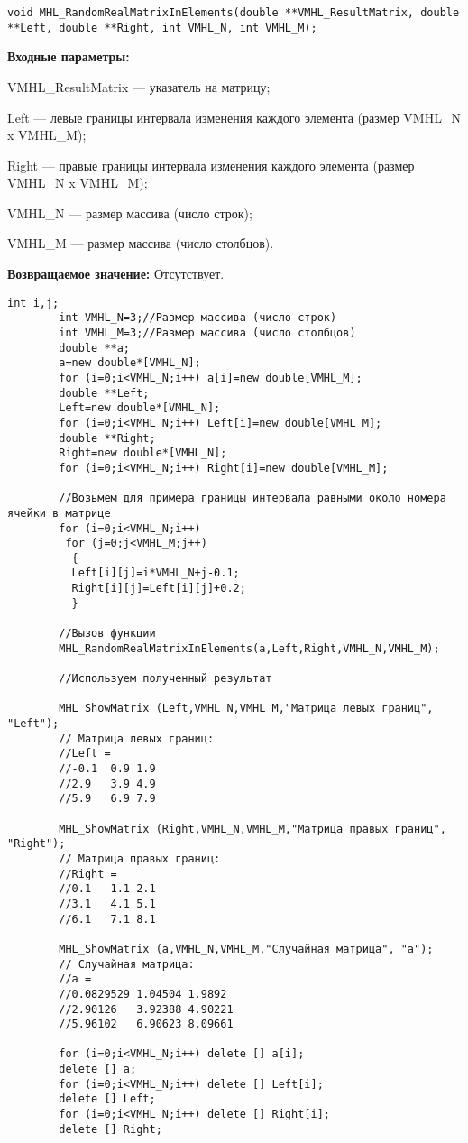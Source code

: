 \documentclass[a4paper,12pt]{article}
\begin{document}
\begin{lstlisting}[label=code_syntax_MHL_RandomRealMatrixInElements,caption=Синтаксис]
void MHL_RandomRealMatrixInElements(double **VMHL_ResultMatrix, double **Left, double **Right, int VMHL_N, int VMHL_M);
\end{lstlisting}

\textbf{Входные параметры:}

 VMHL\_ResultMatrix --- указатель на матрицу;
 
Left --- левые границы интервала изменения каждого элемента (размер VMHL\_N x VMHL\_M);

 Right --- правые границы интервала изменения каждого элемента (размер VMHL\_N x VMHL\_M);
 
 VMHL\_N --- размер массива (число строк);
 
 VMHL\_M --- размер массива (число столбцов).

\textbf{Возвращаемое значение:}
Отсутствует.


\begin{lstlisting}[label=code_use_MHL_RandomRealMatrixInElements,caption=Пример использования]
        int i,j;
        int VMHL_N=3;//Размер массива (число строк)
        int VMHL_M=3;//Размер массива (число столбцов)
        double **a;
        a=new double*[VMHL_N];
        for (i=0;i<VMHL_N;i++) a[i]=new double[VMHL_M];
        double **Left;
        Left=new double*[VMHL_N];
        for (i=0;i<VMHL_N;i++) Left[i]=new double[VMHL_M];
        double **Right;
        Right=new double*[VMHL_N];
        for (i=0;i<VMHL_N;i++) Right[i]=new double[VMHL_M];

        //Возьмем для примера границы интервала равными около номера ячейки в матрице
        for (i=0;i<VMHL_N;i++)
         for (j=0;j<VMHL_M;j++)
          {
          Left[i][j]=i*VMHL_N+j-0.1;
          Right[i][j]=Left[i][j]+0.2;
          }

        //Вызов функции
        MHL_RandomRealMatrixInElements(a,Left,Right,VMHL_N,VMHL_M);

        //Используем полученный результат

        MHL_ShowMatrix (Left,VMHL_N,VMHL_M,"Матрица левых границ", "Left");
        // Матрица левых границ:
        //Left =
        //-0.1	0.9	1.9
        //2.9	3.9	4.9
        //5.9	6.9	7.9

        MHL_ShowMatrix (Right,VMHL_N,VMHL_M,"Матрица правых границ", "Right");
        // Матрица правых границ:
        //Right =
        //0.1	1.1	2.1
        //3.1	4.1	5.1
        //6.1	7.1	8.1

        MHL_ShowMatrix (a,VMHL_N,VMHL_M,"Случайная матрица", "a");
        // Случайная матрица:
        //a =
        //0.0829529	1.04504	1.9892
        //2.90126	3.92388	4.90221
        //5.96102	6.90623	8.09661

        for (i=0;i<VMHL_N;i++) delete [] a[i];
        delete [] a;
        for (i=0;i<VMHL_N;i++) delete [] Left[i];
        delete [] Left;
        for (i=0;i<VMHL_N;i++) delete [] Right[i];
        delete [] Right;
\end{lstlisting}
\end{document}
